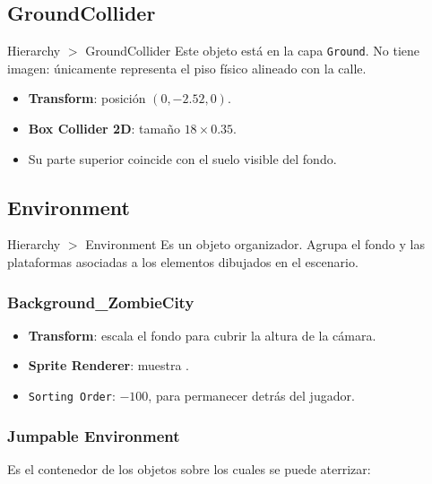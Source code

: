 \documentclass[11pt,a4paper]{article}
\newcommand{\component}[1]{\textbf{\textcolor{metalBlue}{#1}}}
\begin{document}
\subsection{GroundCollider}

\begin{unitybox}{Hierarchy $>$ GroundCollider}
Este objeto está en la capa \texttt{Ground}. No tiene imagen: únicamente representa el piso físico alineado con la calle.
\end{unitybox}

\begin{itemize}
  \item \component{Transform}: posición $(0,-2.52,0)$.
  \item \component{Box Collider 2D}: tamaño $18\times0.35$.
  \item Su parte superior coincide con el suelo visible del fondo.
\end{itemize}

\subsection{Environment}

\begin{unitybox}{Hierarchy $>$ Environment}
Es un objeto organizador. Agrupa el fondo y las plataformas asociadas a los elementos dibujados en el escenario.
\end{unitybox}

\subsubsection*{Background\_ZombieCity}

\begin{itemize}
  \item \component{Transform}: escala el fondo para cubrir la altura de la cámara.
  \item \component{Sprite Renderer}: muestra .
  \item \texttt{Sorting Order}: $-100$, para permanecer detrás del jugador.
\end{itemize}

\subsubsection*{Jumpable Environment}

Es el contenedor de los objetos sobre los cuales se puede aterrizar:
\end{document}
